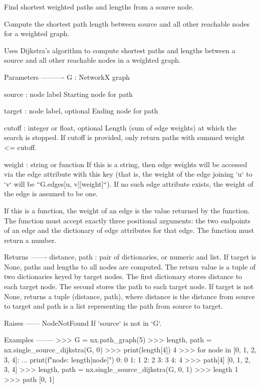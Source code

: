 \begin{DoxyVerb}Find shortest weighted paths and lengths from a source node.

Compute the shortest path length between source and all other
reachable nodes for a weighted graph.

Uses Dijkstra's algorithm to compute shortest paths and lengths
between a source and all other reachable nodes in a weighted graph.

Parameters
----------
G : NetworkX graph

source : node label
    Starting node for path

target : node label, optional
    Ending node for path

cutoff : integer or float, optional
    Length (sum of edge weights) at which the search is stopped.
    If cutoff is provided, only return paths with summed weight <= cutoff.


weight : string or function
    If this is a string, then edge weights will be accessed via the
    edge attribute with this key (that is, the weight of the edge
    joining `u` to `v` will be ``G.edges[u, v][weight]``). If no
    such edge attribute exists, the weight of the edge is assumed to
    be one.

    If this is a function, the weight of an edge is the value
    returned by the function. The function must accept exactly three
    positional arguments: the two endpoints of an edge and the
    dictionary of edge attributes for that edge. The function must
    return a number.

Returns
-------
distance, path : pair of dictionaries, or numeric and list.
    If target is None, paths and lengths to all nodes are computed.
    The return value is a tuple of two dictionaries keyed by target nodes.
    The first dictionary stores distance to each target node.
    The second stores the path to each target node.
    If target is not None, returns a tuple (distance, path), where
    distance is the distance from source to target and path is a list
    representing the path from source to target.

Raises
------
NodeNotFound
    If `source` is not in `G`.

Examples
--------
>>> G = nx.path_graph(5)
>>> length, path = nx.single_source_dijkstra(G, 0)
>>> print(length[4])
4
>>> for node in [0, 1, 2, 3, 4]:
...     print(f"{node}: {length[node]}")
0: 0
1: 1
2: 2
3: 3
4: 4
>>> path[4]
[0, 1, 2, 3, 4]
>>> length, path = nx.single_source_dijkstra(G, 0, 1)
>>> length
1
>>> path
[0, 1]


\end{DoxyVerb}
